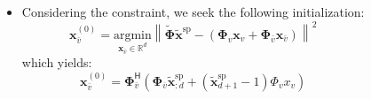 \documentclass[25pt,a0paper]{tikzposter}
\newcommand{\vct}[1]{\bm{#1}} %
\newcommand{\mtx}[1]{\bm{#1}} %
\def\R{\mathbb{R}} %
\begin{document}
\begin{columns}
{\begin{itemize}
\begin{itemize}
\begin{equation*}
       \end{equation*}
       (GEV: Eigenvector with the highest eigenvalue)
       \item Considering the constraint, we seek the following initialization: 
        \begin{equation*}
            \vct{x}_{\bar{v}}^{(0)} = \underset{\vct{x}_{\bar{v}} \in \R^{d}}{\text{argmin}}\left\lVert \widetilde{\mtx{\Phi}}\widetilde{\vct{x}}^{\text{sp}}
            - \left(\mtx{\Phi}_v \vct{x}_v + \mtx{\Phi}_{\bar{v}} \vct{x}_{\bar{v}} \right) \right\rVert^{2}
        \end{equation*}
        which yields:
        \begin{equation*}
            \vct{x}_{\bar{v}}^{(0)} = \mtx{\Phi}_{\bar{v}}^{\mathsf{H}} \left( \mtx{\Phi}_{\overline{v}} \widetilde{\vct{x}}_{:d}^{\text{sp}} + (\widetilde{\vct{x}}_{d+1}^{\text{sp}} -1 ) \Phi_v x_v \right)
        \end{equation*}
\end{itemize}

     
     
        
       

\end{itemize}}
\end{columns}
\end{document}
